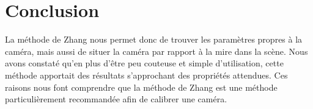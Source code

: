 \documentclass[a4paper]{article}
\begin{document}
\clearpage


\section{Conclusion}

La méthode de Zhang nous permet donc de trouver les paramètres propres à la caméra, mais aussi de situer la caméra par rapport à la mire dans la scène.
Nous avons constaté qu'en plus d'être peu couteuse et simple d'utilisation, cette méthode apportait des résultats s'approchant des propriétés attendues.
Ces raisons nous font comprendre que la méthode de Zhang est une méthode particulièrement recommandée afin de calibrer une caméra.

\clearpage
\end{document}
